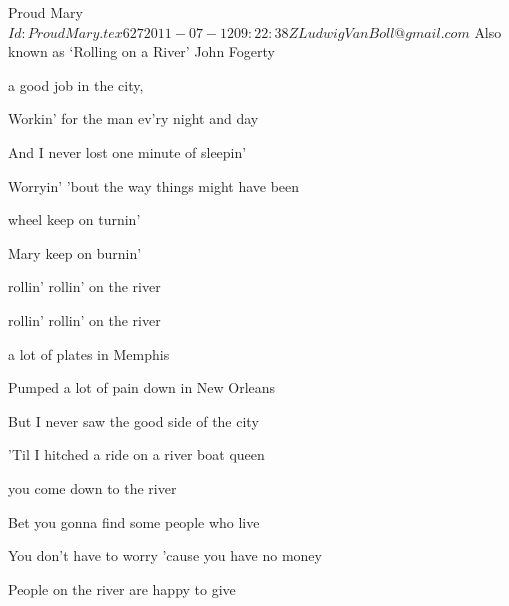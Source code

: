 \begin{SBSong}{Proud Mary}
  {$Id: ProudMary.tex 627 2011-07-12 09:22:38Z LudwigVanBoll@gmail.com $}
  {Also known as `Rolling on a River'}
  {John Fogerty}
  \begin{SBVerse}
     a good job in the city,
    
    Workin' for the man ev'ry night and day
    
    And I never lost one minute of sleepin'
    
    Worryin' 'bout the way things might have been
  \end{SBVerse}
  \begin{SBChorus}
     wheel keep on turnin'
    
     Mary keep on burnin'
    
     rollin' rollin' on the river
    
     rollin' rollin' on the river
  \end{SBChorus}
  \begin{SBVerse}
     a lot of plates in Memphis
    
    Pumped a lot of pain down in New Orleans
    
    But I never saw the good side of the city
    
    'Til I hitched a ride on a river boat queen
  \end{SBVerse}
  \begin{SBVerse}
     you come down to the river
    
    Bet you gonna find some people who live
    
    You don't have to worry 'cause you have no money
    
    People on the river are happy to give
  \end{SBVerse}
\end{SBSong}